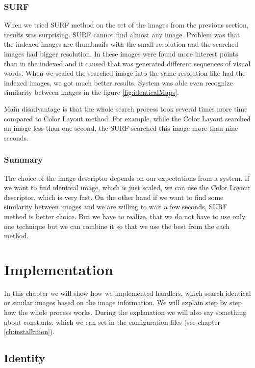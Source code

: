 \documentclass[12pt,a4paper]{report}
\begin{document}
\subsection{SURF}

When we tried SURF method on the set of the images from the previous section, results was surprising. SURF cannot find almost any image. Problem was that the indexed images are thumbnails with the small resolution and the searched images had bigger resolution. In these images were found more interest points than in the indexed and it caused that was generated different sequences of visual words. When we scaled the searched image into the same resolution like had the indexed images, we got much better results. System was able even recognize similarity between images in the figure \ref{fig:identicalMaps}.

Main disadvantage is that the whole search process took several times more time compared to Color Layout method. For example, while the Color Layout searched an image less than one second, the SURF searched this image more than nine seconds.

\subsection{Summary}

The choice of the image descriptor depends on our expectations from a system. If we want to find identical image, which is just scaled, we can use the Color Layout descriptor, which is very fast. On the other hand if we want to find some similarity between images and we are willing to wait a few seconds, SURF method is better choice. But we have to realize, that we do not have to use only one technique but we can combine it so that we use the best from the each method.

\chapter{Implementation}

In this chapter we will show how we implemented handlers, which search identical or similar images based on the image information. We will explain step by step how the whole process works. During the explanation we will also say something about constants, which we can set in the configuration files (see chapter \ref{ch:installation}).

\section{Identity}
\end{document}
